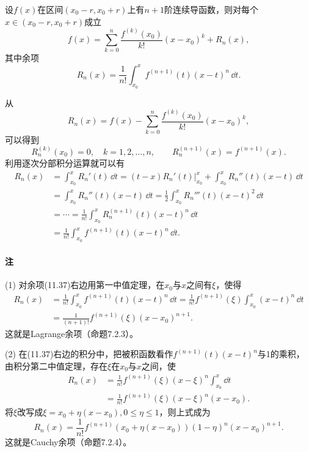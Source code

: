 \begin{xproposition}[11.4.3]
设$f(x)$在区间$(x_0-r,x_0+r)$上有$n+1$阶连续导函数，则对每个$x\in(x_0-r,x_0+r)$成立
\[
  f(x)=\sum_{k=0}^n\frac{f^{(k)}(x_0)}{k!}(x-x_0)^k+R_n(x),
\]
其中余项
\begin{equation}
  R_n(x)=\frac1{n!}\int_{x_0}^xf^{(n+1)}(t)(x-t)^n\,\dd t.
  \tag{11.37}
  \label{eq:11.37}
\end{equation}
\end{xproposition}

\begin{xproof}
从
\[
  R_n(x)=f(x)-\sum_{k=0}^n\frac{f^{(k)}(x_0)}{k!}(x-x_0)^k,
\]
可以得到
\[
  R_n^{(k)}(x_0)=0,\quad k=1,2,\ldots,n,\qquad
  R_n^{(n+1)}(x)=f^{(n+1)}(x).
\]
利用逐次分部积分运算就可以有
\begin{align*}
R_n(x)
&=\int_{x_0}^xR_n'(t)\,\dd t
=(t-x)R_n'(t)\Big|_{x_0}^x+\int_{x_0}^xR_n''(t)(x-t)\,\dd t\\
&=\int_{x_0}^xR_n''(t)(x-t)\,\dd t
=\frac12\int_{x_0}^xR_n'''(t)(x-t)^2\,\dd t\\
&=\cdots=\frac1{n!}\int_{x_0}^xR_n^{(n+1)}(t)(x-t)^n\,\dd t\\
&=\frac1{n!}\int_{x_0}^xf^{(n+1)}(t)(x-t)^n\,\dd t.
\end{align*}
\end{xproof}

\paragraph{注} (1) 对余项(11.37)右边用第一中值定理，在$x_0$与$x$之间有$\xi$，使得
\begin{align*}
R_n(x)
&=\frac1{n!}\int_{x_0}^xf^{(n+1)}(t)(x-t)^n\,\dd t
=\frac1{n!}f^{(n+1)}(\xi)\int_{x_0}^x(x-t)^n\,\dd t\\
&=\frac1{(n+1)!}f^{(n+1)}(\xi)(x-x_0)^{n+1}.
\end{align*}
这就是Lagrange余项（命题7.2.3）。

(2) 在(11.37)右边的积分中，把被积函数看作$f^{(n+1)}(t)(x-t)^n$与1的乘积，由积分第二中值定理，存在$\xi$在$x_0$与$x$之间，使
\begin{align*}
R_n(x)
&=\frac1{n!}f^{(n+1)}(\xi)(x-\xi)^n\int_{x_0}^x\dd t\\
&=\frac1{n!}f^{(n+1)}(\xi)(x-\xi)^n(x-x_0).
\end{align*}
将$\xi$改写成$\xi=x_0+\eta(x-x_0),0\le\eta\le1$，则上式成为
\[
  R_n(x)=\frac1{n!}f^{(n+1)}(x_0+\eta(x-x_0))(1-\eta)^n(x-x_0)^{n+1}.
\]
这就是Cauchy余项（命题7.2.4）。

